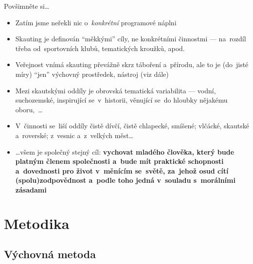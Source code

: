 \documentclass[compress, xelatex, 11pt, xcolor=dvipsnames, aspectratio=169, url={hyphens, lowtilde}]{beamer}
\begin{document}
\begin{frame}{Povšimněte si\ldots}
	\begin{itemize}
		\item Zatím jsme neřekli nic o~\textit{konkrétní} programové náplni
		\item Skauting je definován \enquote{měkkými} cíly, ne konkrétními činnostmi --- na~rozdíl třeba od~sportovních klubů, tematických kroužků, apod.
		\item Veřejnost vnímá skauting převážně skrz táboření a~přírodu, ale to je (do~jisté míry) \enquote{jen} výchovný prostředek, nástroj (viz dále)
		\item Mezi skautskými oddíly je obrovská tematická variabilita --- vodní, suchozemské, inspirující se~v~historii, věnující se~do hloubky nějakému oboru,~\ldots
		\item V~činnosti se~liší oddíly čistě dívčí, čistě chlapecké, smíšené; vlčácké, skautské a~roverské; z~vesnic a~z~velkých měst\ldots
		\item \ldots všem je společný stejný \alert{cíl}: \textbf{vychovat mladého člověka, který bude platným členem společnosti a~bude mít praktické schopnosti a~dovednosti pro život v~měnícím se~světě, za~jehož osud cítí (spolu)zodpovědnost a~podle toho jedná v~souladu s~morálními zásadami}
	\end{itemize}
\end{frame}

\section{Metodika}

\subsection{Výchovná metoda}
\end{document}
